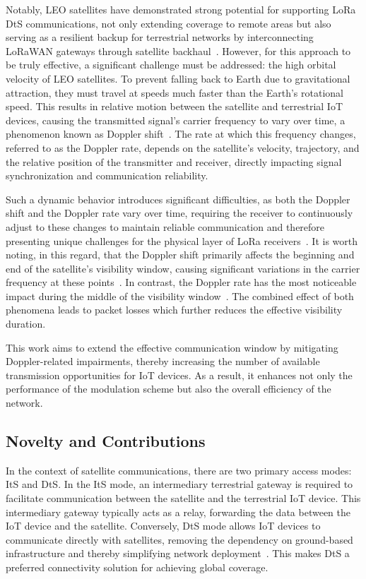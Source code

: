 \documentclass{IEEEtran}
\begin{document}
Notably, \ac{LEO} satellites have demonstrated strong potential for supporting \ac{LoRa} \ac{DtS} communications, not only extending coverage to remote areas but also serving as a resilient backup for terrestrial networks by interconnecting \ac{LoRaWAN} gateways through satellite backhaul~\cite{Mayorga.2020,Fraire.2019,Ullah_Mikhaylov_Alves_22}.
However, for this approach to be truly effective, a significant challenge must be addressed: the high orbital velocity of \ac{LEO} satellites. To prevent falling back to Earth due to gravitational attraction, they must travel at speeds much faster than the Earth’s rotational speed. This results in relative motion between the satellite and terrestrial \ac{IoT} devices, causing the transmitted signal’s carrier frequency to vary over time, a phenomenon known as Doppler shift~\cite{Ullah.2024}. The rate at which this frequency changes, referred to as the Doppler rate, depends on the satellite's velocity, trajectory, and the relative position of the transmitter and receiver, directly impacting signal synchronization and communication reliability.


Such a dynamic behavior introduces significant difficulties, as both the Doppler shift and the Doppler rate vary over time, requiring the receiver to continuously adjust to these changes to maintain reliable communication and therefore presenting unique challenges for the physical layer of \ac{LoRa} receivers~\cite{Kodheli.2021, Centenaro.2021}. It is worth noting, in this regard, that the Doppler shift primarily affects the beginning and end of the satellite's visibility window, causing significant variations in the carrier frequency at these points~\cite{Ullah.2024}. In contrast, the Doppler rate has the most noticeable impact during the middle of the visibility window~\cite{Ullah.2024}. The combined effect of both phenomena leads to packet losses which further reduces the effective visibility duration. 

This work aims to extend the effective communication window by mitigating Doppler-related impairments, thereby increasing the number of available transmission opportunities for IoT devices. As a result, it enhances not only the performance of the modulation scheme but also the overall efficiency of the network.

\subsection{Novelty and Contributions}

In the context of satellite communications, there are two primary access modes: \ac{ItS} and \acf{DtS}. In the \ac{ItS} mode, an intermediary terrestrial gateway is required to facilitate communication between the satellite and the terrestrial \ac{IoT} device. This intermediary gateway typically acts as a relay, forwarding the data between the \ac{IoT} device and the satellite. Conversely, \ac{DtS} mode allows \ac{IoT} devices to communicate directly with satellites, removing the dependency on ground-based infrastructure and thereby simplifying network deployment~\cite{Fraire.2019, Alvarez.2022}. This makes \ac{DtS} a preferred connectivity solution for achieving global coverage.
\end{document}
